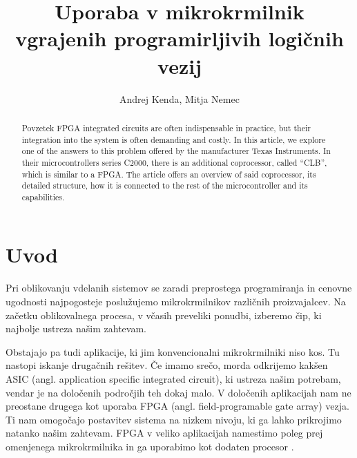 \documentclass[a4paper]{article}
\begin{document}
\begin{sloppypar}
\title{Uporaba v mikrokrmilnik vgrajenih programirljivih logičnih vezij}

\author{Andrej Kenda, Mitja Nemec}



\maketitle



\begin{abstract}{Povzetek}
FPGA integrated circuits are often indispensable in practice, but their
integration into the system is often demanding and costly. In this article, we
explore one of the answers to this problem offered by the manufacturer Texas
Instruments. In their microcontrollers series C2000, there is an additional coprocessor,
called ``CLB'', which is similar to a FPGA. The article offers an overview of
said coprocessor, its detailed structure, how it is connected to the rest of
the microcontroller and its capabilities.
\end{abstract}




\section{Uvod}
Pri oblikovanju vdelanih sistemov se zaradi preprostega programiranja in
cenovne ugodnosti najpogosteje poslužujemo mikrokrmilnikov različnih
proizvajalcev. Na začetku oblikovalnega procesa, v včasih preveliki ponudbi,
izberemo čip, ki najbolje ustreza našim zahtevam.

Obstajajo pa tudi aplikacije, ki jim konvencionalni mikrokrmilniki niso kos. Tu
nastopi iskanje drugačnih rešitev. Če imamo srečo, morda odkrijemo kakšen ASIC
(angl. application specific integrated circuit), ki ustreza našim potrebam,
vendar je na določenih področjih teh dokaj malo. V določenih aplikacijah nam ne
preostane drugega kot uporaba FPGA (angl. field-programable gate array) vezja.
Ti nam omogočajo postavitev sistema na nizkem nivoju, ki ga lahko prikrojimo
natanko našim zahtevam. FPGA v veliko aplikacijah namestimo poleg prej
omenjenega mikrokrmilnika in ga uporabimo kot dodaten procesor
\cite{chen-fpga-automation}.


\end{sloppypar}
\end{document}
